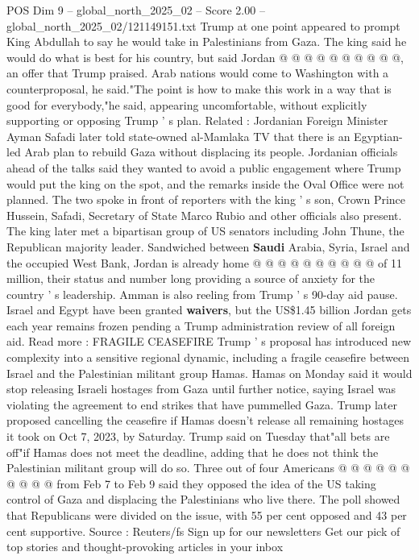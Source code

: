 \begin{textsample}{POS Dim 9 – global\_north\_2025\_02 – Score 2.00 – global\_north\_2025\_02/121149151.txt}
Trump at one point appeared to prompt King Abdullah to say he would take in Palestinians from Gaza.
The king said he would do what is best for his country, but said Jordan @ @ @ @ @ @ @ @ @ @, an offer that Trump praised.
Arab nations would come to Washington with a counterproposal, he said."The point is how to make this work in a way that is good for everybody,"he said, appearing uncomfortable, without explicitly supporting or opposing Trump ' s plan.
Related : Jordanian Foreign Minister Ayman Safadi later told state-owned al-Mamlaka TV that there is an Egyptian-led Arab plan to rebuild Gaza without displacing its people.
Jordanian officials ahead of the talks said they wanted to avoid a public engagement where Trump would put the king on the spot, and the remarks inside the Oval Office were not planned.
The two spoke in front of reporters with the king ' s son, Crown Prince Hussein, Safadi, Secretary of State Marco Rubio and other officials also present.
The king later met a bipartisan group of US senators including John Thune, the Republican majority leader.
Sandwiched between \textbf{Saudi} Arabia, Syria, Israel and the occupied West Bank, Jordan is already home @ @ @ @ @ @ @ @ @ @ of 11 million, their status and number long providing a source of anxiety for the country ' s leadership.
Amman is also reeling from Trump ' s 90-day aid pause.
Israel and Egypt have been granted \textbf{waivers}, but the US\$1.45 billion Jordan gets each year remains frozen pending a Trump administration review of all foreign aid.
Read more : FRAGILE CEASEFIRE Trump ' s proposal has introduced new complexity into a sensitive regional dynamic, including a fragile ceasefire between Israel and the Palestinian militant group Hamas.
Hamas on Monday said it would stop releasing Israeli hostages from Gaza until further notice, saying Israel was violating the agreement to end strikes that have pummelled Gaza.
Trump later proposed cancelling the ceasefire if Hamas doesn't release all remaining hostages it took on Oct 7, 2023, by Saturday.
Trump said on Tuesday that"all bets are off"if Hamas does not meet the deadline, adding that he does not think the Palestinian militant group will do so.
Three out of four Americans @ @ @ @ @ @ @ @ @ @ from Feb 7 to Feb 9 said they opposed the idea of the US taking control of Gaza and displacing the Palestinians who live there.
The poll showed that Republicans were divided on the issue, with 55 per cent opposed and 43 per cent supportive.
Source : Reuters/fs Sign up for our newsletters Get our pick of top stories and thought-provoking articles in your inbox

\end{textsample}
